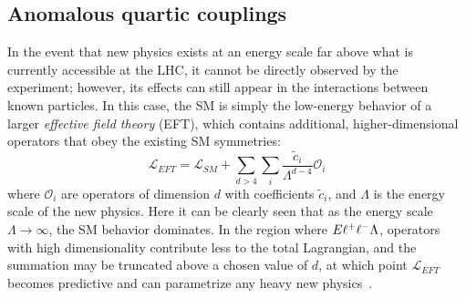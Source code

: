 \subsection{Anomalous quartic couplings}\label{ssww13tef:aqgc}
In the event that new physics exists at an energy scale far above what is currently accessible at the LHC, it cannot be directly observed by the experiment; however, its effects can still appear in the interactions between known particles.
In this case, the SM is simply the low-energy behavior of a larger \emph{effective field theory} (EFT), which contains additional, higher-dimensional operators that obey the existing SM symmetries:
\begin{equation}
  \mathcal{L}_{EFT} = \mathcal{L}_{SM}+\sum\limits_{d > 4}\sum\limits_i \frac{\tilde{c}_{i}}{\Lambda^{d-4}}\mathcal{O}_{i}
  \label{eq:eft_lagrangian}
\end{equation}
where $\mathcal{O}_i$ are operators of dimension $d$ with coefficients $\tilde{c}_i$, and $\Lambda$ is the energy scale of the new physics.
Here it can be clearly seen that as the energy scale $\Lambda\rightarrow\infty$, the SM behavior dominates.
In the region where $E\muchless\Lambda$, operators with high dimensionality contribute less to the total Lagrangian, and the summation may be truncated above a chosen value of $d$, at which point $\mathcal{L}_{EFT}$ becomes predictive and can parametrize any heavy new physics~\cite{2013.aqgc-mc}.


